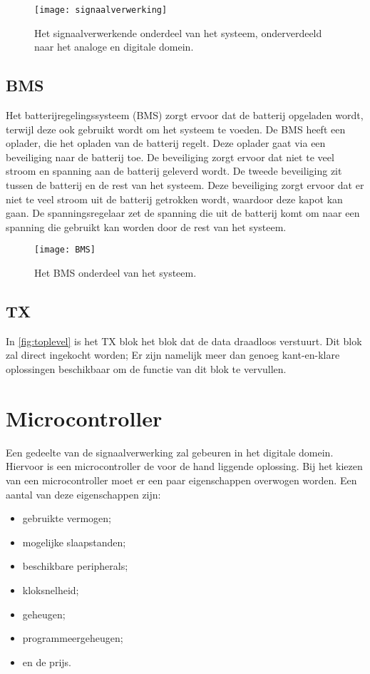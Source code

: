 \begin{figure}[ht]
    \centering
    \texttt{[image: signaalverwerking]}
    \caption{Het signaalverwerkende onderdeel van het systeem, onderverdeeld naar het analoge en digitale domein.}
    \label{fig:signaalverwerking}
\end{figure}

\subsection{BMS}
Het batterijregelingssysteem (BMS) zorgt ervoor dat de batterij opgeladen wordt, terwijl deze ook gebruikt wordt om het systeem te voeden.
De BMS heeft een oplader, die het opladen van de batterij regelt. Deze oplader gaat via een beveiliging naar de batterij toe. De beveiliging zorgt ervoor dat niet te veel stroom en spanning aan de batterij geleverd wordt. De tweede beveiliging zit tussen de batterij en de rest van het systeem. Deze beveiliging zorgt ervoor dat er niet te veel stroom uit de batterij getrokken wordt, waardoor deze kapot kan gaan. De spanningsregelaar zet de spanning die uit de batterij komt om naar een spanning die gebruikt kan worden door de rest van het systeem. 

\begin{figure}[ht]
    \centering
    \texttt{[image: BMS]}
    \caption{Het BMS onderdeel van het systeem.}
    \label{fig:BMS}
\end{figure}

\subsection{TX}
In \autoref{fig:toplevel} is het TX blok het blok dat de data draadloos verstuurt. Dit blok zal direct ingekocht worden; Er zijn namelijk meer dan genoeg kant-en-klare oplossingen beschikbaar om de functie van dit blok te vervullen.


\section{Microcontroller}
Een gedeelte van de signaalverwerking zal gebeuren in het digitale domein. Hiervoor is een microcontroller de voor de hand liggende oplossing. Bij het kiezen van een microcontroller moet er een paar eigenschappen overwogen worden. Een aantal van deze eigenschappen zijn:
\begin{itemize}
    \item gebruikte vermogen;
    \item mogelijke slaapstanden;
    \item beschikbare peripherals;
    \item kloksnelheid;
    \item geheugen;
    \item programmeergeheugen;
    \item en de prijs.
\end{itemize}
